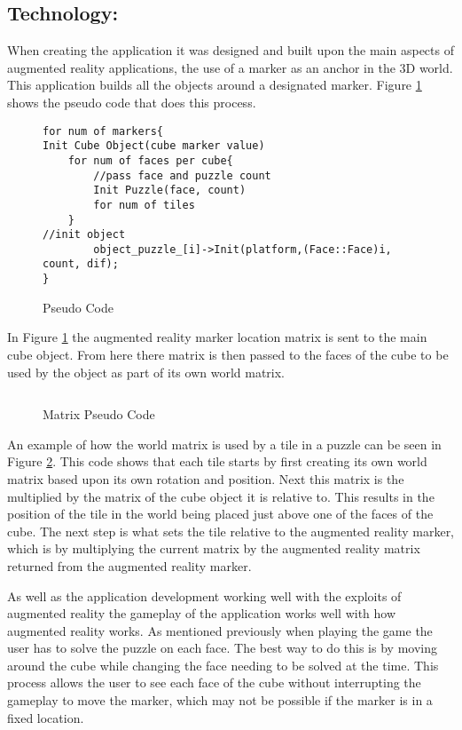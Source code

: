 \subsection{Technology: }\label{tech}
When creating the application it was designed and built upon the main aspects of augmented reality applications, the use of a marker as an anchor in the 3D world.
This application builds all the objects around a designated marker.
Figure \ref{sc:position_pseudo} shows the pseudo code that does this process.

\begin{figure}[h|]
\centering
\begin{lstlisting}
for num of markers{
Init Cube Object(cube marker value)
	for num of faces per cube{
		//pass face and puzzle count
		Init Puzzle(face, count)
		for num of tiles
	}
//init object
		object_puzzle_[i]->Init(platform,(Face::Face)i, count, dif);
}
\end{lstlisting}
\caption{Pseudo Code}
\label{sc:position_pseudo}
\end{figure}

In Figure \ref{sc:position_pseudo} the augmented reality marker location matrix is sent to the main cube object.
From here there matrix is then passed to the faces of the cube to be used by the object as part of its own world matrix.

\begin{figure}[h|]
\centering
\begin{lstlisting}

\end{lstlisting}
\caption{Matrix Pseudo Code}
\label{sc:matrix_pseudo}
\end{figure}

An example of how the world matrix is used by a tile in a puzzle can be seen in Figure \ref{sc:matrix_pseudo}.
This code shows that each tile starts by first creating its own world matrix based upon its own rotation and position.
Next this matrix is the multiplied by the matrix of the cube object it is relative to.
This results in the position of the tile in the world being placed just above one of the faces of the cube.
The next step is what sets the tile relative to the augmented reality marker, which is by multiplying the current matrix by the augmented reality matrix returned from the augmented reality marker.

As well as the application development working well with the exploits of augmented reality the gameplay of the application works well with how augmented reality works.
As mentioned previously when playing the game the user has to solve the puzzle on each face.
The best way to do this is by moving around the cube while changing the face needing to be solved at the time.
This process allows the user to see each face of the cube without interrupting the gameplay to move the marker, which may not be possible if the marker is in a fixed location.
